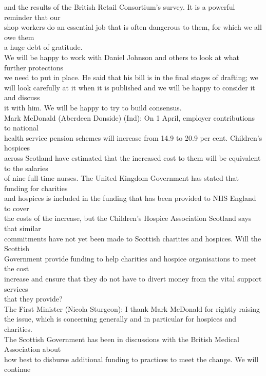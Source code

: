 \documentclass{article}
\begin{document}
\begin{description}
{and the results of the British Retail Consortium’s survey. It is a powerful reminder that our\\
shop workers do an essential job that is often dangerous to them, for which we all owe them\\
a huge debt of gratitude.\\
We will be happy to work with Daniel Johnson and others to look at what further protections\\
we need to put in place. He said that his bill is in the final stages of drafting; we\\
will look carefully at it when it is published and we will be happy to consider it and discuss\\
it with him. We will be happy to try to build consensus.\\
Mark McDonald (Aberdeen Donside) (Ind): On 1 April, employer contributions to national\\
health service pension schemes will increase from 14.9 to 20.9 per cent. Children’s hospices\\
across Scotland have estimated that the increased cost to them will be equivalent to the salaries\\
of nine full-time nurses. The United Kingdom Government has stated that funding for charities\\
and hospices is included in the funding that has been provided to NHS England to cover\\
the costs of the increase, but the Children’s Hospice Association Scotland says that similar\\
commitments have not yet been made to Scottish charities and hospices. Will the Scottish\\
Government provide funding to help charities and hospice organisations to meet the cost\\
increase and ensure that they do not have to divert money from the vital support services\\
that they provide?\\
The First Minister (Nicola Sturgeon): I thank Mark McDonald for rightly raising\\
the issue, which is concerning generally and in particular for hospices and charities.\\
The Scottish Government has been in discussions with the British Medical Association about\\
how best to disburse additional funding to practices to meet the change. We will continue\\
}
\end{description}
\end{document}
